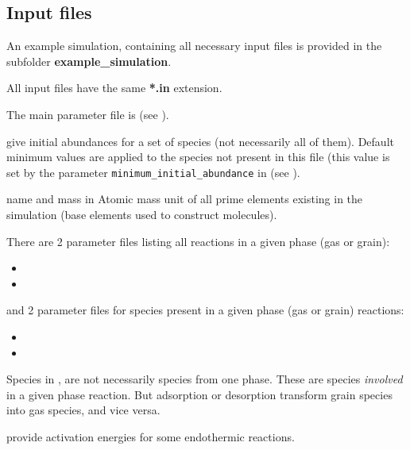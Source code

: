 \documentclass[english,a4paper,twoside]{article}
\begin{document}
\subsection{Input files}
An example simulation, containing all necessary input files is provided in the subfolder \textbf{example\_simulation}.

\begin{attention}
All input files have the same \textbf{*.in} extension.
\end{attention}

The main parameter file is  (see ).

 give initial abundances for a set of species (not necessarily all of them). Default minimum values are applied to the species not present in this file (this value is set by the parameter \verb|minimum_initial_abundance| in  (see ).

 name and mass in Atomic mass unit of all prime elements existing in the simulation (base elements used to construct molecules).

There are 2 parameter files listing all reactions in a given phase (gas or grain): 
\begin{itemize}
\item {}
\item {}
\end{itemize}
and 2 parameter files for species present in a given phase (gas or grain) reactions:
\begin{itemize}
\item {}
\item {}
\end{itemize}

\begin{remarque}
Species in ,  are not necessarily species from one phase. These are species \emph{involved} in a given phase reaction. But adsorption or desorption transform grain species into gas species, and vice versa. 
\end{remarque}

 provide activation energies for some endothermic reactions. 
\end{document}
